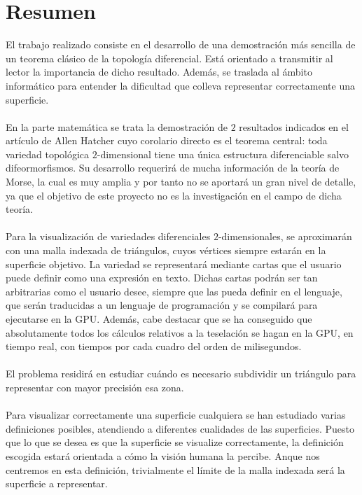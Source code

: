 %

\chapter{Resumen}
El trabajo realizado consiste en el desarrollo de una demostración más sencilla de un teorema clásico de la topología diferencial. Está orientado a transmitir al lector la importancia de dicho resultado. Además, se traslada al ámbito informático para entender la dificultad que colleva representar correctamente una superficie.\\
\\En la parte matemática se trata la demostración de $2$ resultados indicados en el artículo de Allen Hatcher \cite{arXiv:1312.3518} cuyo corolario directo es el teorema central: toda variedad topológica $2$-dimensional tiene una única estructura diferenciable salvo difeormorfismos. Su desarrollo requerirá de mucha información de la teoría de Morse, la cual es muy amplia y por tanto no se aportará un gran nivel de detalle, ya que el objetivo de este proyecto no es la investigación en el campo de dicha teoría.\\
\\Para la visualización de variedades diferenciales $2$-dimensionales, se aproximarán con una malla indexada de triángulos, cuyos vértices siempre estarán en la superficie objetivo. La variedad se representará mediante cartas que el usuario puede definir como una expresión en texto. Dichas cartas podrán ser tan arbitrarias como el usuario desee, siempre que las pueda definir en el lenguaje, que serán traducidas a un lenguaje de programación y se compilará para ejecutarse en la GPU. Además, cabe destacar que se ha conseguido que absolutamente todos los cálculos relativos a la teselación se hagan en la GPU, en tiempo real, con tiempos por cada cuadro del orden de milisegundos.\\
\\El problema residirá en estudiar cuándo es necesario subdividir un triángulo para representar con mayor precisión esa zona.\\
\\Para visualizar correctamente una superficie cualquiera se han estudiado varias definiciones posibles, atendiendo a diferentes cualidades de las superficies. Puesto que lo que se desea es que la superficie se visualize correctamente, la definición escogida estará orientada a cómo la visión humana la percibe. Anque nos centremos en esta definición, trivialmente el límite de la malla indexada será la superficie a representar.\\
